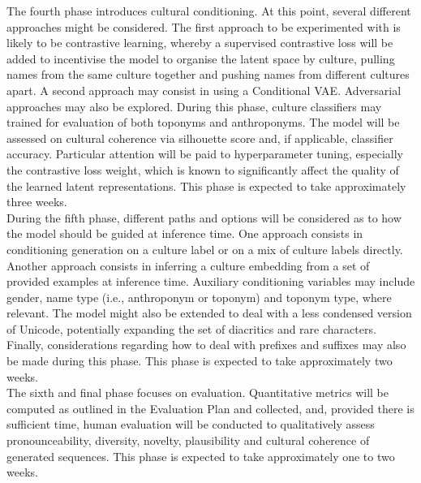 \documentclass[Main.tex]{subfiles}
\begin{document}
The fourth phase introduces cultural conditioning. At this point, several different approaches might be considered. The first approach to be experimented with is likely to be contrastive learning, whereby a supervised contrastive loss will be added to incentivise the model to organise the latent space by culture, pulling names from the same culture together and pushing names from different cultures apart. A second approach may consist in using a Conditional VAE. Adversarial approaches may also be explored. During this phase, culture classifiers may trained for evaluation of both toponyms and anthroponyms. The model will be assessed on cultural coherence via silhouette score and, if applicable, classifier accuracy. Particular attention will be paid to hyperparameter tuning, especially the contrastive loss weight, which is known to significantly affect the quality of the learned latent representations. This phase is expected to take approximately three weeks.\\

During the fifth phase, different paths and options will be considered as to how the model should be guided at inference time. One approach consists in conditioning generation on a culture label or on a mix of culture labels directly. Another approach consists in inferring a culture embedding from a set of provided examples at inference time. Auxiliary conditioning variables may include gender, name type (i.e., anthroponym or toponym) and toponym type, where relevant. The model might also be extended to deal with a less condensed version of Unicode, potentially expanding the set of diacritics and rare characters. Finally, considerations regarding how to deal with prefixes and suffixes may also be made during this phase. This phase is expected to take approximately two weeks.\\

The sixth and final phase focuses on evaluation. Quantitative metrics will be computed as outlined in the Evaluation Plan and collected, and, provided there is sufficient time, human evaluation will be conducted to qualitatively assess pronounceability, diversity, novelty, plausibility and cultural coherence of generated sequences. This phase is expected to take approximately one to two weeks.\\


\end{document}
